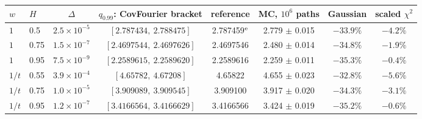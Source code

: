 \begin{tabular}{llcccccc}\toprule
$w$ & $H$ & $\Delta$ & $q_{0.99}$: CovFourier bracket & reference & MC, $10^6$ paths & Gaussian & scaled $\chi^2$\\\midrule
$1$ & 0.5 & $2.5\times10^{-5}$ & $[2.787434,\ 2.788475]$ & 2.787459$^{\rm e}$ & 2.779 $\pm$ 0.015 & $-33.9\%$ & $-4.2\%$\\
$1$ & 0.75 & $1.5\times10^{-7}$ & $[2.4697544,\ 2.4697626]$ & 2.4697546 & 2.480 $\pm$ 0.014 & $-34.8\%$ & $-1.9\%$\\
$1$ & 0.95 & $7.5\times10^{-9}$ & $[2.2589615,\ 2.2589620]$ & 2.2589616 & 2.259 $\pm$ 0.011 & $-35.3\%$ & $-0.4\%$\\
$1/t$ & 0.55 & $3.9\times10^{-4}$ & $[4.65782,\ 4.67208]$ & 4.65822 & 4.655 $\pm$ 0.023 & $-32.8\%$ & $-5.6\%$\\
$1/t$ & 0.75 & $1.0\times10^{-5}$ & $[3.909089,\ 3.909545]$ & 3.909100 & 3.917 $\pm$ 0.020 & $-34.3\%$ & $-3.1\%$\\
$1/t$ & 0.95 & $1.2\times10^{-7}$ & $[3.4166564,\ 3.4166629]$ & 3.4166566 & 3.424 $\pm$ 0.019 & $-35.2\%$ & $-0.6\%$\\
\bottomrule\end{tabular}
